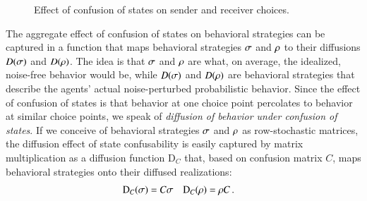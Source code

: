 \documentclass[fleqn,reqno,10pt]{article}
\newcommand{\Diff}{\ensuremath{\mathrm{D}}} %
\begin{document}
\begin{figure}

  \caption{Effect of confusion of states on sender and receiver
    choices.}
  \label{fig:noise-perturbation-of-strategies}
\end{figure}

The aggregate effect of confusion of states on behavioral strategies
can be captured in a function that maps behavioral strategies
$\sigma$ and $\rho$ to their diffusions $D(\sigma)$ and
$D(\rho)$. The idea is that $\sigma$ and $\rho$ are what, on
average, the idealized, noise-free behavior would be, while
$D(\sigma)$ and $D(\rho)$ are behavioral strategies that describe
the agents' actual noise-perturbed probabilistic behavior. Since the
effect of confusion of states is that behavior at one choice point
percolates to behavior at similar choice points, we speak of
\emph{diffusion of behavior under confusion of states}. If we
conceive of behavioral strategies $\sigma$ and $\rho$ as
row-stochastic matrices, the diffusion effect of state confusability
is easily captured by matrix multiplication as a diffusion function
$\Diff_C$ that, based on confusion matrix $C$, maps behavioral
strategies onto their diffused realizations:
\begin{align}
  \label{eq:confusion-function}
  \Diff_C(\Sstrat) & = C \Sstrat &    \Diff_C(\Rstrat) & = \Rstrat C\,.
\end{align}
\end{document}
